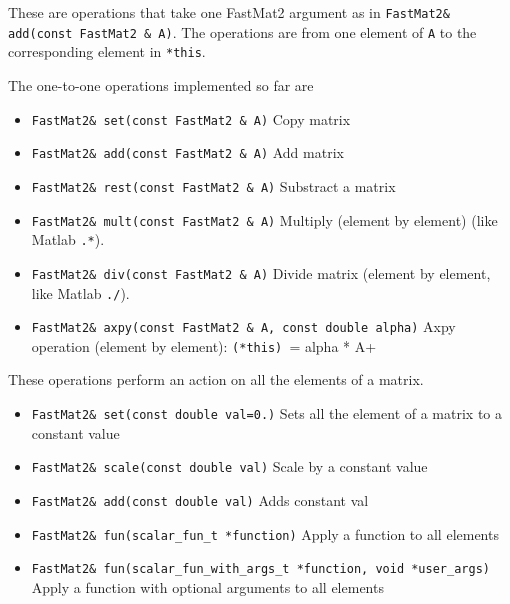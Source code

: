 
{\raggedright 
{} These are operations that take one
FastMat2 argument as in \verb+FastMat2& add(const FastMat2 & A)+.\hfil 
The operations are from one element of \verb+A+ to the corresponding
element in \verb+*this+. 

The one-to-one operations implemented so far are
%
\begin{itemize}
\item \verb+FastMat2& set(const FastMat2 & A)+
              Copy matrix 

\item \verb+FastMat2& add(const FastMat2 & A)+
              Add matrix 

\item \verb+FastMat2& rest(const FastMat2 & A)+
              Substract a matrix 

\item \verb+FastMat2& mult(const FastMat2 & A)+ 
              Multiply (element by element) (like Matlab \verb+.*+). 

\item \verb+FastMat2& div(const FastMat2 & A)+ 
             Divide matrix (element by element, like Matlab \verb+./+). 

\item \verb+FastMat2& axpy(const FastMat2 & A, const double alpha)+ 
             Axpy operation (element by element): \verb+(*this) += alpha * A+ 
\end{itemize}


These operations perform an action on all the elements of a matrix. 

\begin{itemize}
\item \verb+FastMat2& set(const double val=0.)+
              Sets all the element of a matrix to a constant value 
\item \verb+FastMat2& scale(const double val)+ 
              Scale by a constant value 
\item\verb+FastMat2& add(const double val)+
              Adds constant val 
\item\verb+FastMat2& fun(scalar_fun_t *function)+
              Apply a function to all elements 
\item\verb+FastMat2& fun(scalar_fun_with_args_t *function, void *user_args)+
              Apply a function with optional arguments to all elements 
\end{itemize}

}
